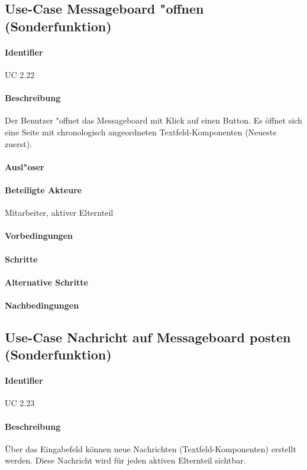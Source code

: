   
  \newpage
 \subsection{Use-Case Messageboard "offnen (Sonderfunktion)}
  \paragraph{Identifier}
  UC 2.22
  \paragraph{Beschreibung}
  Der Benutzer "offnet das Messageboard mit Klick auf einen Button. Es öffnet sich eine Seite mit chronologisch angeordneten Textfeld-Komponenten (Neueste zuerst). 
  \paragraph{Ausl"oser}
  \paragraph{Beteiligte Akteure}   \leavevmode \newline
    Mitarbeiter, aktiver Elternteil
  \paragraph{Vorbedingungen}
  \paragraph{Schritte}
  \paragraph{Alternative Schritte}
  \paragraph{Nachbedingungen}

  
  \newpage
 \subsection{Use-Case Nachricht auf Messageboard posten (Sonderfunktion)}
  \paragraph{Identifier}
  UC 2.23
  \paragraph{Beschreibung}
  Über das Eingabefeld können neue Nachrichten (Textfeld-Komponenten) erstellt werden. Diese Nachricht wird für jeden aktiven Elternteil sichtbar.

